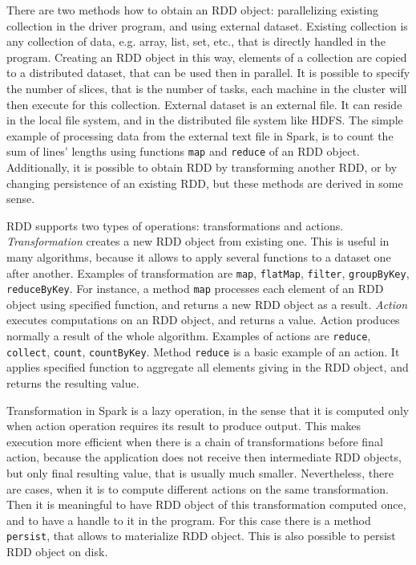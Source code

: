 There are two methods how to obtain an RDD object: parallelizing existing collection in the driver program, and using external dataset.
Existing collection is any collection of data, e.g. array, list, set, etc., that is directly handled in the program.
Creating an RDD object in this way, elements of a collection are copied to a distributed dataset, that can be used then in parallel.
It is possible to specify the number of slices, that is the number of tasks, each machine in the cluster will then execute for this collection.
External dataset is an external file.
It can reside in the local file system, and in the distributed file system like HDFS.
The simple example of processing data from the external text file in Spark, is to count the sum of lines' lengths using functions \lstinline{map} and \lstinline{reduce} of an RDD object. 
Additionally, it is possible to obtain RDD by transforming another RDD, or by changing persistence of an existing RDD, but these methods are derived in some sense.

RDD supports two types of operations: transformations and actions.
\textit{Transformation}  creates a new RDD object from existing one.
This is useful in many algorithms, because it allows to apply several functions to a dataset one after another.
Examples of transformation are \lstinline{map}, \lstinline{flatMap}, \lstinline{filter}, \lstinline{groupByKey}, \lstinline{reduceByKey}.
For instance, a method \lstinline{map} processes each element of an RDD object using specified function, and returns a new RDD object as a result.
\textit{Action}  executes computations on an RDD object, and returns a value.
Action produces normally a result of the whole algorithm.
Examples of actions are \lstinline{reduce}, \lstinline{collect}, \lstinline{count}, \lstinline{countByKey}.
Method \lstinline{reduce} is a basic example of an action.
It applies specified function to aggregate all elements giving in the RDD object, and returns the resulting value.

Transformation in Spark is a lazy operation, in the sense that it is computed only when action operation requires its result to produce output.
This makes execution more efficient when there is a chain of transformations before final action, because the application does not receive then intermediate RDD objects, but only final resulting value, that is usually much smaller.
Nevertheless, there are cases, when it is to compute different actions on the same transformation.
Then it is meaningful to have RDD object of this transformation computed once, and to have a handle to it in the program.
For this case there is a method \lstinline{persist}, that allows to materialize RDD object.
This is also possible to persist RDD object on disk.


